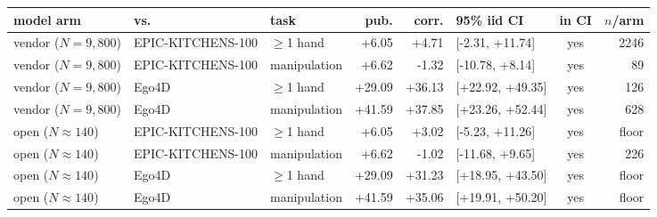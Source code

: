 \begin{tabular}{@{}lllrrlcr@{}}
\toprule
model arm & vs. & task & pub. & corr. & 95\% iid CI & in CI & $n$/arm \\
\midrule
vendor ($N{=}9{,}800$) & EPIC-KITCHENS-100 & $\geq$1 hand & +6.05 & +4.71 & [-2.31, +11.74] & yes & 2246 \\
vendor ($N{=}9{,}800$) & EPIC-KITCHENS-100 & manipulation & +6.62 & -1.32 & [-10.78, +8.14] & yes & 89 \\
vendor ($N{=}9{,}800$) & Ego4D & $\geq$1 hand & +29.09 & +36.13 & [+22.92, +49.35] & yes & 126 \\
vendor ($N{=}9{,}800$) & Ego4D & manipulation & +41.59 & +37.85 & [+23.26, +52.44] & yes & 628 \\
\midrule
open ($N{\approx}140$) & EPIC-KITCHENS-100 & $\geq$1 hand & +6.05 & +3.02 & [-5.23, +11.26] & yes & floor \\
open ($N{\approx}140$) & EPIC-KITCHENS-100 & manipulation & +6.62 & -1.02 & [-11.68, +9.65] & yes & 226 \\
open ($N{\approx}140$) & Ego4D & $\geq$1 hand & +29.09 & +31.23 & [+18.95, +43.50] & yes & floor \\
open ($N{\approx}140$) & Ego4D & manipulation & +41.59 & +35.06 & [+19.91, +50.20] & yes & floor \\
\bottomrule
\end{tabular}
